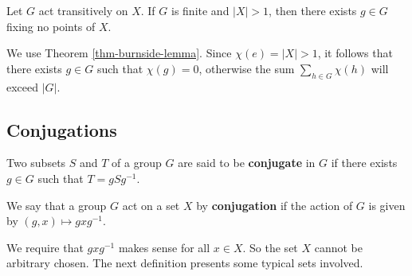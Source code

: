 \begin{proposition}
	Let $G$ act transitively on $X$. If $G$ is finite and $|X|>1$, then there exists $g\in G$ fixing no points of $X$.
\end{proposition}
\begin{sketch}
	We use Theorem \ref{thm-burnside-lemma}. Since $\chi(e) = |X|>1$, it follows that there exists $g\in G$ such that $\chi(g) = 0$, otherwise the sum $\sum_{h\in G}\chi(h)$ will exceed $|G|$.
\end{sketch}



\subsection{Conjugations}
\begin{definition}
	Two subsets $S$ and $T$ of a group $G$ are said to be \textbf{conjugate} in $G$ if there exists $g \in G$ such that $T =
	gSg^{-1}$.
\end{definition}
\begin{definition}
	We say that a group $G$ act on a set $X$ by \textbf{conjugation} if the action of $G$ is given by $(g,x)\mapsto gxg^{-1}$.
\end{definition}
\begin{remark}
	We require that $gxg^{-1}$ makes sense for all $x\in X$. So the set $X$ cannot be arbitrary chosen. The next definition presents some typical sets involved.
\end{remark}

